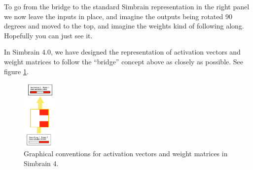 To go from the bridge to the standard Simbrain representation in the right panel we now leave the inputs in place, and imagine the outputs being rotated 90 degrees and moved to the top, and imagine the weights kind of following along. Hopefully you can just see it. 

In Simbrain 4.0, we have designed the representation of activation vectors and weight matrices to follow the ``bridge'' concept above as closely as possible.  See figure \ref{simbrain4_ff23}.

\begin{figure}[h]
\centering
\includegraphics[width=0.15\textwidth]{images/simbrain4_ff_2_3.png}
\caption[Jeff Yoshimi.]{Graphical conventions for activation vectors and weight matrices in Simbrain 4. }
\label{simbrain4_ff23}
\end{figure}

